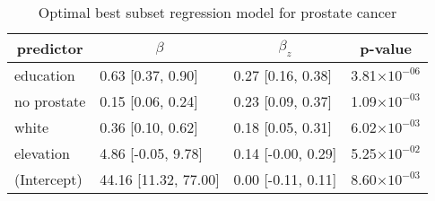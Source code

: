%
\begin{table}[!tbp]
\caption{Optimal best subset regression model for prostate cancer\label{SI_tab:prostate}} 
\begin{center}
\begin{tabular}{llll}
\hline\hline
\multicolumn{1}{c}{predictor}&\multicolumn{1}{c}{$\beta$}&\multicolumn{1}{c}{$\beta_z$}&\multicolumn{1}{c}{p-value}\tabularnewline
\hline
education&0.63 [0.37, 0.90]&0.27 [0.16, 0.38]&3.81$\times10^{-06}$\tabularnewline
no prostate&0.15 [0.06, 0.24]&0.23 [0.09, 0.37]&1.09$\times10^{-03}$\tabularnewline
white&0.36 [0.10, 0.62]&0.18 [0.05, 0.31]&6.02$\times10^{-03}$\tabularnewline
elevation&4.86 [-0.05, 9.78]&0.14 [-0.00, 0.29]&5.25$\times10^{-02}$\tabularnewline
(Intercept)&44.16 [11.32, 77.00]&0.00 [-0.11, 0.11]&8.60$\times10^{-03}$\tabularnewline
\hline
\end{tabular}
\end{center}
\end{table}

